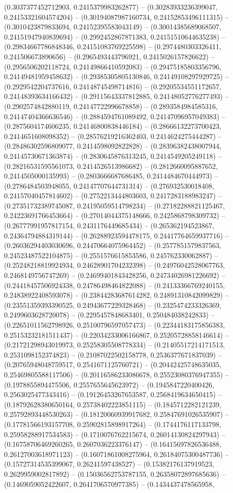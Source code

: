 (0.3037377452712903, 0.2415379983262877) -- (0.30283933236399047, 0.24153321604574204) -- (0.30194087987160734, 0.24152853496111315) -- (0.3010423879833694, 0.24152395583043149) -- (0.30014385689068507, 0.24151947940839694) -- (0.2992452867871383, 0.24151510644635238) -- (0.29834667786848346, 0.24151083769225598) -- (0.2974480303326411, 0.241506673890656) -- (0.2965493443796921, 0.2415026157826622) -- (0.2956506202118724, 0.24149866410592083) -- (0.29475185803356796, 0.24149481959458632) -- (0.29385305805130846, 0.24149108297929725) -- (0.2929542204737616, 0.24148745498714816) -- (0.29205534551172657, 0.24148393634166432) -- (0.29115643337812885, 0.24148052776277493) -- (0.2902574842880119, 0.24147722996678858) -- (0.2893584984585316, 0.24147404366636546) -- (0.2884594761089492, 0.24147096957049383) -- (0.2875604174606235, 0.24146800838446184) -- (0.28666132273700423, 0.2414651608098352) -- (0.28576219216362403, 0.2414624275444287) -- (0.28486302596809077, 0.2414598092822828) -- (0.28396382438007944, 0.24145730671363874) -- (0.2830645876313245, 0.2414549205249118) -- (0.28216531595561073, 0.2414526513986682) -- (0.2812660095887652, 0.2414505000135993) -- (0.2803666687686485, 0.2414484670444973) -- (0.2786484503948055, 0.24147707644731314) -- (0.276932530018408, 0.24157040457814602) -- (0.2752213444803603, 0.2417283188983247) -- (0.27351732389745087, 0.24195059514798234) -- (0.27182288821125467, 0.24223691766453664) -- (0.27014044375148666, 0.2425868798309732) -- (0.26777991957817154, 0.2431176449685434) -- (0.265362194523867, 0.24364794884319144) -- (0.26288923594478175, 0.24417764659937716) -- (0.26036294403030696, 0.24470664075964452) -- (0.2577851579837563, 0.24523487522104875) -- (0.2551576615853586, 0.245762330062887) -- (0.25248218819924934, 0.24628901704232398) -- (0.24976042528067763, 0.2468149756747269) -- (0.24699401843428256, 0.24734026981226692) -- (0.24418457506924338, 0.24786498464822088) -- (0.24133366769240155, 0.24838922408593078) -- (0.23844283687614282, 0.24891310842099829) -- (0.23551359393390525, 0.24943677229328468) -- (0.2325474233326369, 0.2499603628720078) -- (0.2295457848683401, 0.250484038242833) -- (0.22651011562798926, 0.25100796597057473) -- (0.22344183175856383, 0.25153232181511437) -- (0.22034233006166867, 0.25205728858146614) -- (0.21721298943019973, 0.25258305508778334) -- (0.21405517214171513, 0.2531098152374823) -- (0.21087022502158778, 0.2536377671837039) -- (0.20765948048759517, 0.2541671125760721) -- (0.20442425748635035, 0.25469805588117506) -- (0.20116586233086678, 0.25523080376947355) -- (0.1978855894475506, 0.2557655645623972) -- (0.1945847220400426, 0.2563025477343416) -- (0.19126453267653587, 0.2568419634650415) -- (0.18792628380650164, 0.25738402223851115) -- (0.1845712282121239, 0.25792893448530263) -- (0.18120060939917682, 0.25847691026535907) -- (0.17781566193157708, 0.25902815898917264) -- (0.1744176117133798, 0.25958288917534583) -- (0.1710076762215674, 0.26014130824297943) -- (0.16758706469260265, 0.2607036223376147) -- (0.16415697826536488, 0.26127003618971123) -- (0.16071861008275964, 0.26184075300487736) -- (0.15727314535399067, 0.26241597438527) -- (0.15382176137919523, 0.2629959002817892) -- (0.15036562753787155, 0.26358072897685636) -- (0.1469059052422607, 0.2641706570977385) -- (0.1434437478565958, 
